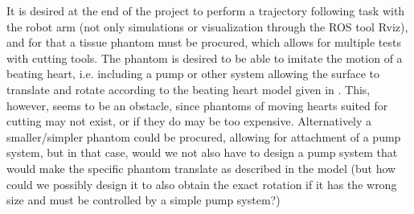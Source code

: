 It is desired at the end of the project to perform a trajectory following task with the robot arm (not only simulations or visualization through the ROS tool Rviz), and for that a tissue phantom must be procured, which allows for multiple tests with cutting tools. The phantom is desired to be able to imitate the motion of a beating heart, i.e. including a pump or other system allowing the surface to translate and rotate according to the beating heart model given in \citep{bib:heart_model}. This, however, seems to be an obstacle, since phantoms of moving hearts suited for cutting may not exist, or if they do may be too expensive. Alternatively a smaller/simpler phantom could be procured, allowing for attachment of a pump system, but in that case, would we not also have to design a pump system that would make the specific phantom translate as described in the model (but how could we possibly design it to also obtain the exact rotation if it has the wrong size and must be controlled by a simple pump system?)




